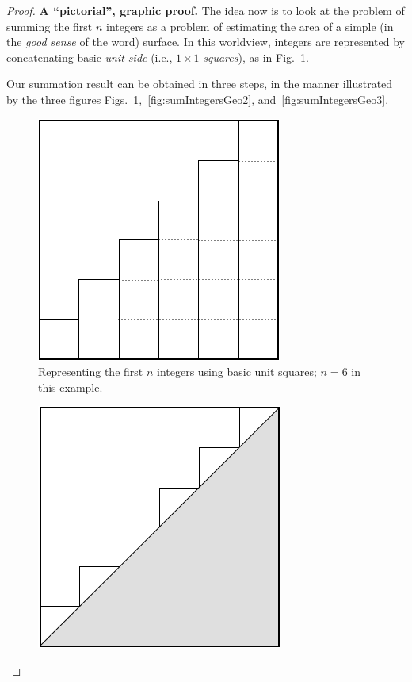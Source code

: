 \begin{proof}
{\bf A ``pictorial'', graphic proof.}
%
The idea now is to look at the problem of summing the first $n$
integers as a problem of estimating the area of a simple (in the
\textit{good sense} of the word) surface.  In this worldview, integers
are represented by concatenating basic {\it unit-side} (i.e., $1
\times 1$  {\it squares}), as in
Fig.~\ref{fig:sumIntegersGeo1}.

Our summation result can be obtained in three steps, in the manner
illustrated by the three figures
Figs.~\ref{fig:sumIntegersGeo1},~\ref{fig:sumIntegersGeo2},
and~\ref{fig:sumIntegersGeo3}.
\begin{figure}[h]
\begin{center}
       \includegraphics[scale=0.4]{FiguresMaths/SumIntegersGeometricBasis}
\caption{Representing the first $n$ integers using basic unit squares; $n=6$ in this example.}
       \label{fig:sumIntegersGeo1}
\end{center}
\end{figure}
\begin{figure}[h]
\begin{center}
       \includegraphics[scale=0.4]{FiguresMaths/SumIntegersGeometricIntermediate}

\end{center}
\end{figure}
\end{proof}

